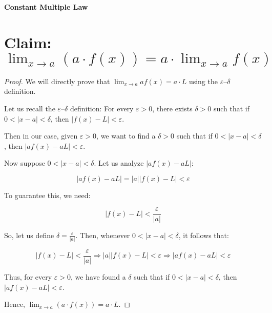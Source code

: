 \documentclass{article}
\begin{document}
	
\textbf{Constant Multiple Law}
	
\section*{Claim: $\lim_{x \to a} \left( a \cdot f(x) \right) = a \cdot \lim_{x \to a} f(x)$}


\begin{proof}


We will directly prove that $\lim_{x \to a} af(x) = a \cdot L$ using the $\varepsilon$--$\delta$ definition.

\bigskip

Let us recall the $\varepsilon$--$\delta$ definition:  
For every $\varepsilon > 0$, there exists $\delta > 0$ such that if $0 < |x - a| < \delta$, then $|f(x) - L| < \varepsilon$.

\bigskip

Then in our case, given $\varepsilon > 0$, we want to find a $\delta > 0$ such that if $0 < |x - a| < \delta$, then $|af(x) - aL| < \varepsilon$.

\bigskip

Now suppose $0 < |x - a| < \delta$. Let us analyze $|af(x) - aL|$:

\[
|af(x) - aL| = |a||f(x) - L| < \varepsilon
\]

\bigskip

To guarantee this, we need:

\[
|f(x) - L| < \frac{\varepsilon}{|a|}
\]

\bigskip

So, let us define $\delta = \frac{\varepsilon}{|a|}$. Then, whenever $0 < |x - a| < \delta$, it follows that:

\[
|f(x) - L| < \frac{\varepsilon}{|a|} \Rightarrow |a||f(x) - L| < \varepsilon \Rightarrow |af(x) - aL| < \varepsilon
\]

\bigskip

Thus, for every $\varepsilon > 0$, we have found a $\delta$ such that if $0 < |x - a| < \delta$, then $|af(x) - aL| < \varepsilon$.

\bigskip

Hence, $\lim_{x \to a} (a \cdot f(x)) = a \cdot L$.





\end{proof}
\end{document}
